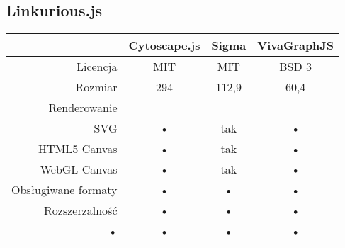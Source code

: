 \subsection{Linkurious.js}

\begin{table}[H]
\begin{tabularx}{\textwidth}{|r|c|c|c}
\hline 
 & Cytoscape.js & Sigma & VivaGraphJS \\ 
\hline 
Licencja & MIT & MIT & BSD 3 \\ 
\hline 
Rozmiar & 294 & 112,9 & 60,4 \\ 
\hline 
Renderowanie & & & \\
SVG & • & tak & • \\
HTML5 Canvas & • & tak & • \\
WebGL Canvas & • & tak & • \\ 
\hline 
Obsługiwane formaty & • & • & • \\ 
\hline
Rozszerzalność & • & • & • \\ 
\hline 
• & • & • & • \\ 
\hline 
\end{tabularx} 
\end{table}


